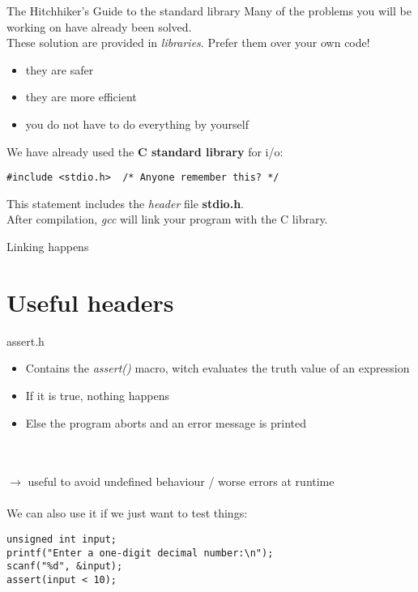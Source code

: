 \begin{frame}[fragile]{The Hitchhiker's Guide to the standard library}
	Many of the problems you will be working on have already been solved.\\
	\bigskip
	These solution are provided in \textit{libraries}. Prefer them over your own code!\\
	\begin{itemize}
		\item they are safer
		\item they are more efficient
		\item you do not have to do everything by yourself
	\end{itemize}
	\bigskip
	We have already used the \textbf{C standard library} for i/o:
\begin{lstlisting}[numbers=none]
#include <stdio.h>	/* Anyone remember this? */
\end{lstlisting}
	This statement includes the \textit{header} file \textbf{stdio.h}.\\
	After compilation, \textit{gcc} will link your program with the C library.\\
\end{frame}


\begin{frame}{Linking happens}
	\centering
\end{frame}

\section{Useful headers}

\begin{frame}[fragile]{assert.h}
	 \begin{itemize}
	 	\item Contains the \textit{assert()} macro, witch evaluates the truth value of an expression
	 	\item If it is true, nothing happens
	 	\item Else the program aborts and an error message is printed
	 \end{itemize} \ \\ \ \\
	 $\rightarrow$ useful to avoid undefined behaviour / worse errors at runtime \\ \ \\
	 We can also use it if we just want to test things:
	 \begin{lstlisting}[numbers=none]
unsigned int input;
printf("Enter a one-digit decimal number:\n");
scanf("%d", &input);
assert(input < 10);
\end{lstlisting}
\end{frame}

